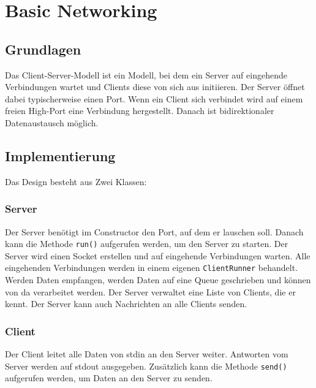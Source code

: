 \chapter{Basic Networking}

\section{Grundlagen}
Das Client-Server-Modell ist ein Modell, bei dem ein Server auf eingehende Verbindungen wartet und Clients diese von sich aus initiieren. Der Server öffnet dabei typischerweise einen Port. Wenn ein Client sich verbindet wird auf einem freien High-Port eine Verbindung hergestellt. Danach ist bidirektionaler Datenaustausch möglich.

\section{Implementierung}
Das Design besteht aus Zwei Klassen:

\subsection{Server}
Der Server benötigt im Constructor den Port, auf dem er lauschen soll.
Danach kann die Methode \texttt{run()} aufgerufen werden, um den Server zu starten.
Der Server wird einen Socket erstellen und auf eingehende Verbindungen warten.
Alle eingehenden Verbindungen werden in einem eigenen \texttt{ClientRunner} behandelt.
Werden Daten empfangen, werden Daten auf eine Queue geschrieben und können von da verarbeitet werden.
Der Server verwaltet eine Liste von Clients, die er kennt. Der Server kann auch Nachrichten an alle Clients senden.

\subsection{Client}
Der Client leitet alle Daten von stdin an den Server weiter. Antworten vom Server werden auf stdout ausgegeben.
Zusätzlich kann die Methode \texttt{send()} aufgerufen werden, um Daten an den Server zu senden.

